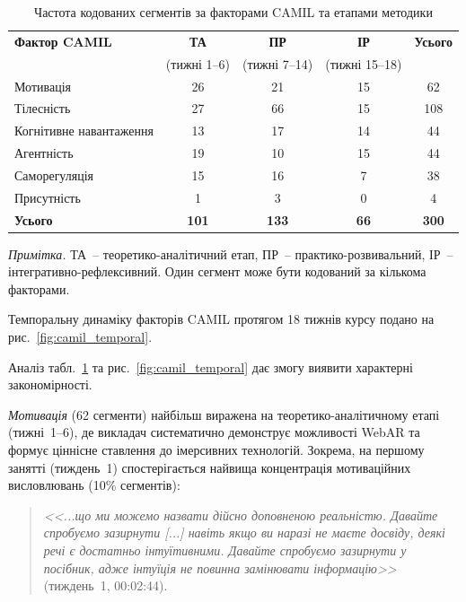 \begin{table}[!h]
\centering
\caption{Частота кодованих сегментів за факторами CAMIL та етапами методики}
\label{tab:camil_stages}
\small
\begin{tabular}{|l|c|c|c|c|}
\hline
\hfill \textbf{Фактор CAMIL} & \textbf{ТА} & \textbf{ПР} & \textbf{ІР} & \textbf{Усього} \\
 & (тижні 1--6) & (тижні 7--14) & (тижні 15--18) & \\
\hline
Мотивація & 26 & 21 & 15 & 62 \\
\hline
Тілесність & 27 & 66 & 15 & 108 \\
\hline
Когнітивне навантаження & 13 & 17 & 14 & 44 \\
\hline
Агентність & 19 & 10 & 15 & 44 \\
\hline
Саморегуляція & 15 & 16 & 7 & 38 \\
\hline
Присутність & 1 & 3 & 0 & 4 \\
\hline
\textbf{Усього} & \textbf{101} & \textbf{133} & \textbf{66} & \textbf{300} \\
\hline
\end{tabular}

\medskip
\footnotesize
\textit{Примітка.} ТА~-- теоретико-аналітичний етап, ПР~-- практико-розвивальний, ІР~-- інтегративно-рефлексивний. Один сегмент може бути кодований за кількома факторами.
\end{table}

Темпоральну динаміку факторів CAMIL протягом 18 тижнів курсу подано на рис.~\ref{fig:camil_temporal}.



Аналіз табл.~\ref{tab:camil_stages} та рис.~\ref{fig:camil_temporal} дає змогу виявити характерні закономірності.

\textit{Мотивація} (62 сегменти) найбільш виражена на теоретико-аналітичному етапі (тижні~1--6), де викладач систематично демонструє можливості WebAR та формує ціннісне ставлення до імерсивних технологій. Зокрема, на першому занятті (тиждень~1) спостерігається найвища концентрація мотиваційних висловлювань (10\% сегментів):

\begin{quote}
\textit{<<...що ми можемо назвати дійсно доповненою реальністю. Давайте спробуємо зазирнути \textnormal{[...]} навіть якщо ви наразі не маєте досвіду, деякі речі є достатньо інтуїтивними. Давайте спробуємо зазирнути у посібник, адже інтуїція не повинна замінювати інформацію>>} (тиждень~1, 00:02:44).
\end{quote}

